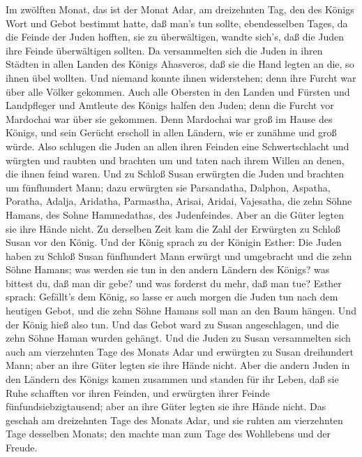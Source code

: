  Im zwölften Monat, das ist der Monat Adar, am dreizehnten
Tag, den des Königs Wort und Gebot bestimmt hatte, daß man's tun sollte,
ebendesselben Tages, da die Feinde der Juden hofften, sie zu
überwältigen, wandte sich's, daß die Juden ihre Feinde überwältigen
sollten.  Da versammelten sich die Juden in ihren Städten in
allen Landen des Königs Ahasveros, daß sie die Hand legten an die, so
ihnen übel wollten. Und niemand konnte ihnen widerstehen; denn ihre
Furcht war über alle Völker gekommen.  Auch alle Obersten in
den Landen und Fürsten und Landpfleger und Amtleute des Königs halfen
den Juden; denn die Furcht vor Mardochai war über sie gekommen.
 Denn Mardochai war groß im Hause des Königs, und sein
Gerücht erscholl in allen Ländern, wie er zunähme und groß würde.
 Also schlugen die Juden an allen ihren Feinden eine
Schwertschlacht und würgten und raubten und brachten um und taten nach
ihrem Willen an denen, die ihnen feind waren.  Und zu Schloß
Susan erwürgten die Juden und brachten um fünfhundert Mann; 
dazu erwürgten sie Parsandatha, Dalphon, Aspatha,  Poratha,
Adalja, Aridatha,  Parmastha, Arisai, Aridai, Vajesatha,
 die zehn Söhne Hamans, des Sohne Hammedathas, des
Judenfeindes. Aber an die Güter legten sie ihre Hände nicht.
 Zu derselben Zeit kam die Zahl der Erwürgten zu Schloß
Susan vor den König.  Und der König sprach zu der Königin
Esther: Die Juden haben zu Schloß Susan fünfhundert Mann erwürgt und
umgebracht und die zehn Söhne Hamans; was werden sie tun in den andern
Ländern des Königs? was bittest du, daß man dir gebe? und was forderst
du mehr, daß man tue?  Esther sprach: Gefällt's dem König,
so lasse er auch morgen die Juden tun nach dem heutigen Gebot, und die
zehn Söhne Hamans soll man an den Baum hängen.  Und der
König hieß also tun. Und das Gebot ward zu Susan angeschlagen, und die
zehn Söhne Haman wurden gehängt.  Und die Juden zu Susan
versammelten sich auch am vierzehnten Tage des Monats Adar und erwürgten
zu Susan dreihundert Mann; aber an ihre Güter legten sie ihre Hände
nicht.  Aber die andern Juden in den Ländern des Königs
kamen zusammen und standen für ihr Leben, daß sie Ruhe schafften vor
ihren Feinden, und erwürgten ihrer Feinde fünfundsiebzigtausend; aber an
ihre Güter legten sie ihre Hände nicht.  Das geschah am
dreizehnten Tage des Monats Adar, und sie ruhten am vierzehnten Tage
desselben Monats; den machte man zum Tage des Wohllebens und der Freude.
